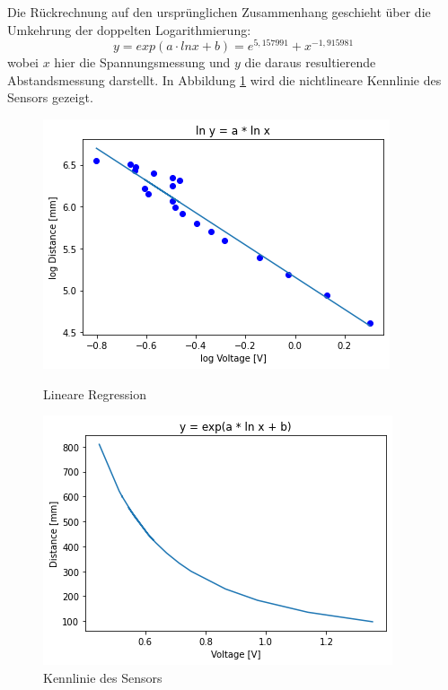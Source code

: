 \documentclass[12pt, oneside, a4paper, \docLanguage]{report}
\begin{document}
Die Rückrechnung auf den ursprünglichen Zusammenhang geschieht über die Umkehrung
der doppelten Logarithmierung:
\[ y = exp(a \cdot ln x + b) = e^{5,157991} + x^{-1,915981} \]
wobei \(x\) hier die Spannungsmessung und \(y\) die daraus resultierende Abstandsmessung darstellt.
In Abbildung \ref{fig:VERSUCH_2_MESSWERTE_PLOT3} wird die nichtlineare Kennlinie des Sensors gezeigt.
\begin{figure}[H]
	\centering\small
	\includegraphics[width=\textwidth]{media/plot_versuch2_logAbstand_logSpannung_regression.png}
	\caption{Lineare Regression}
	\label{fig:VERSUCH_2_MESSWERTE_PLOT2}

	\centering\small
	\includegraphics[width=\textwidth]{media/plot_versuch2_spannung_abstand_regression.png}
	\caption{Kennlinie des Sensors}
	\label{fig:VERSUCH_2_MESSWERTE_PLOT3}
\end{figure}
\end{document}
